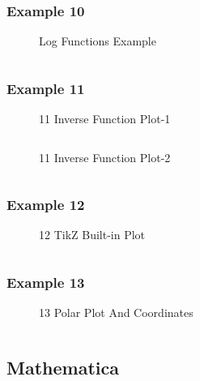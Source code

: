 \subsubsection{Example 10}
\begin{figure}[!htb]
    \centering
    
    \caption{Log Functions Example}
    \label{fig:10-log-function}
\end{figure}
\inputminted{latex}{./Example/example_10.tex}
\newpage


\subsubsection{Example 11}
\begin{figure}[!htb]
    \centering
    
    \caption{11 Inverse Function Plot-1}
    \label{fig:11-inverse-function-1}
\end{figure}
\inputminted{latex}{./Example/example_11_1.tex}

\begin{figure}[!htb]
    \centering
    
    \caption{11 Inverse Function Plot-2}
    \label{fig:11-inverse-function-2}
\end{figure}
\inputminted{latex}{./Example/example_11_2.tex}
\newpage

\subsubsection{Example 12}
\begin{figure}[!htb]
    \centering
    
    \caption{12 TikZ Built-in Plot}
    \label{fig:12-tikz-plot}
\end{figure}
\inputminted{latex}{./Example/example_12.tex}
\newpage

\subsubsection{Example 13}
\begin{figure}[!htb]
    \centering
    
    \caption{13 Polar Plot And Coordinates}
    \label{fig:13-polar-plot}
\end{figure}
\inputminted{latex}{./Example/example_13.tex}
\newpage


\subsection{Mathematica}
